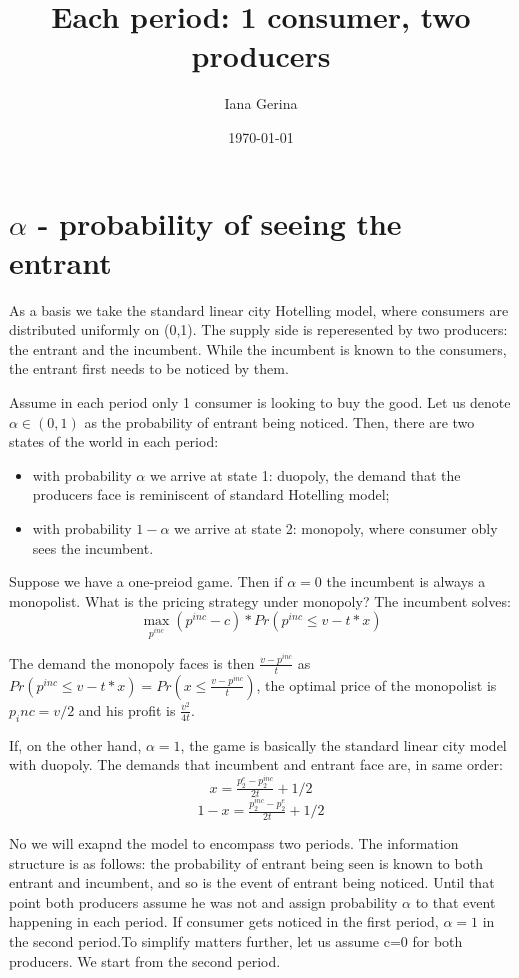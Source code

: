 \documentclass{article}
\title{Each period: 1 consumer, two producers}
\author{Iana Gerina}
\date{\today}
\begin{document}
\maketitle


\section{$\alpha$ - probability of seeing the entrant}

As a basis we take the standard linear city Hotelling model, where consumers are distributed uniformly on (0,1). The supply side is reperesented by two producers: the entrant and the incumbent. While the incumbent is known to the consumers, the entrant first needs to be noticed by them. 

Assume in each period only 1 consumer is looking to buy the good. Let us denote $\alpha \in (0,1)$ as the probability of entrant being noticed. Then, there are two states of the world in each period:

\begin{itemize}
    \item with probability $\alpha$ we arrive at state 1: duopoly, the demand that the producers face is reminiscent of standard Hotelling model;
    \item with probability $1-\alpha$ we arrive at state 2: monopoly, where consumer obly sees the incumbent.
\end{itemize}

Suppose we have a one-preiod game. Then if $\alpha = 0$ the incumbent is always a monopolist. What is the pricing strategy under monopoly? The incumbent solves:
$$\max_{p^{inc}} (p^{inc}-c)* Pr(p^{inc}\leq v-t*x)$$

The demand the monopoly faces is then $\frac{v-p^{inc}}{t}$ as $Pr(p^{inc}\leq v-t*x) = Pr(x\leq \frac{v-p^{inc}}{t})$, the optimal price of the monopolist is $p_inc = v/2 $ and his profit is $\tfrac{v^2}{4t}$.

If, on the other hand, $\alpha=1$, the game is basically the standard linear city model with duopoly. The demands that incumbent and entrant face are, in same order:
$$ x =  \tfrac{p^{e}_2 - p^{inc}_2}{2t} + 1/2 $$
$$1-x = \tfrac{p^{inc}_2 - p^{e}_2}{2t} + 1/2$$

No we will exapnd the model to encompass two periods. The information structure is as follows: the probability of entrant being seen is known to both entrant and incumbent, and so is the event of entrant being noticed. Until that point both producers assume he was not and assign probability $\alpha$ to that event happening in each period. If consumer gets noticed in the first period, $\alpha =1$ in the second period.To simplify matters further, let us assume c=0 for both producers. We start from the second period.
\end{document}
